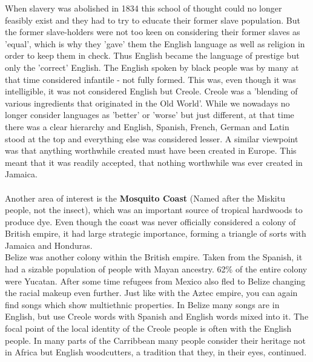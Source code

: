 \documentclass{article}
\begin{document}
	When slavery was abolished in 1834 this school of thought could no longer feasibly exist and they had to try to educate their former slave population. But the former slave-holders were not too keen on considering their former slaves as 'equal', which is why they 'gave' them the English language as well as religion in order to keep them in check. Thus English became the language of prestige but only the 'correct' English. The English spoken by black people was by many at that time considered infantile - not fully formed. This was, even though it was intelligible, it was not considered English but Creole. Creole was a 'blending of various ingredients that originated in the Old World'. While we nowadays no longer consider languages as 'better' or 'worse' but just different, at that time there was a clear hierarchy and English, Spanish, French, German and Latin stood at the top and everything else was considered lesser. A similar viewpoint was that anything worthwhile created must have been created in Europe. This meant that it was readily accepted, that nothing worthwhile was ever created in Jamaica. \\ \\

	Another area of interest is the \textbf{Mosquito Coast} (Named after the Miskitu people, not the insect), which was an important source of tropical hardwoods to produce dye. Even though the coast was never officially considered a colony of British empire, it had large strategic importance, forming a triangle of sorts with Jamaica and Honduras. \\
	Belize was another colony within the British empire. Taken from the Spanish, it had a sizable population of people with Mayan ancestry. 62\% of the entire colony were Yucatan. After some time refugees from Mexico also fled to Belize changing the racial makeup even further. Just like with the Aztec empire, you can again find songs which show multiethnic properties. In Belize many songs are in English, but use Creole words with Spanish and English words mixed into it. The focal point of the local identity of the Creole people is often with the English people. In many parts of the Carribbean many people consider their heritage not in Africa but English woodcutters, a tradition that they, in their eyes, continued. \\
\end{document}
